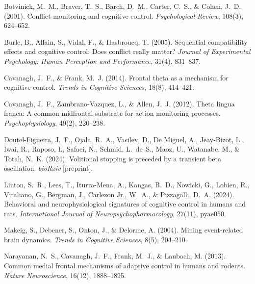 \documentclass[11pt]{article}
\begin{document}

\begin{thebibliography}{99}

Botvinick, M.~M., Braver, T.~S., Barch, D.~M., Carter, C.~S., \& Cohen, J.~D. (2001).
\newblock Conflict monitoring and cognitive control.
\newblock \emph{Psychological Review}, 108(3), 624--652.

Burle, B., Allain, S., Vidal, F., \& Hasbroucq, T. (2005).
\newblock Sequential compatibility effects and cognitive control: Does conflict really matter?
\newblock \emph{Journal of Experimental Psychology: Human Perception and Performance}, 31(4), 831--837.


Cavanagh, J.~F., \& Frank, M.~J. (2014).
\newblock Frontal theta as a mechanism for cognitive control.
\newblock \emph{Trends in Cognitive Sciences}, 18(8), 414--421.

Cavanagh, J.~F., Zambrano-Vazquez, L., \& Allen, J.~J. (2012).
\newblock Theta lingua franca: A common midfrontal substrate for action monitoring processes.
\newblock \emph{Psychophysiology}, 49(2), 220--238.


Doutel-Figueira, J.~F., Ojala, R.~A., Vasilev, D., De Miguel, A., Jeay-Bizot, L., Iwai, R., Raposo, I., Safaei, N., Schmid, L.~de~S., Maoz, U., Watanabe, M., \& Totah, N.~K. (2024).
\newblock Volitional stopping is preceded by a transient beta oscillation.
\newblock \emph{bioRxiv} [preprint].

Linton, S.~R., Lees, T., Iturra-Mena, A., Kangas, B.~D., Nowicki, G., Lobien, R., Vitaliano, G., Bergman, J., Carlezon Jr., W.~A., \& Pizzagalli, D.~A. (2024).
\newblock Behavioral and neurophysiological signatures of cognitive control in humans and rats.
\newblock \emph{International Journal of Neuropsychopharmacology}, 27(11), pyae050.


Makeig, S., Debener, S., Onton, J., \& Delorme, A. (2004).
\newblock Mining event-related brain dynamics.
\newblock \emph{Trends in Cognitive Sciences}, 8(5), 204--210.

Narayanan, N.~S., Cavanagh, J.~F., Frank, M.~J., \& Laubach, M. (2013).
\newblock Common medial frontal mechanisms of adaptive control in humans and rodents.
\newblock \emph{Nature Neuroscience}, 16(12), 1888--1895.


\end{thebibliography}
\end{document}

